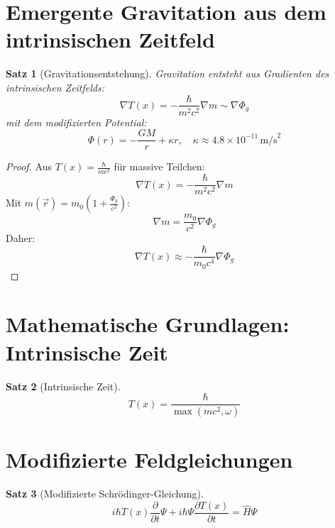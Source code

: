 \documentclass{article}
\newcommand{\Tfield}{T(x)}
\newtheorem{theorem}{Satz}[section]
\begin{document}
	\section{Emergente Gravitation aus dem intrinsischen Zeitfeld}
	\begin{theorem}[Gravitationsentstehung]
		Gravitation entsteht aus Gradienten des intrinsischen Zeitfelds:
		\begin{equation}
			\nabla \Tfield = -\frac{\hbar}{m^2 c^2} \nabla m \sim \nabla \Phi_g
		\end{equation}
		mit dem modifizierten Potential:
		\begin{equation}
			\Phi(r) = -\frac{GM}{r} + \kappa r, \quad \kappa \approx 4.8 \times 10^{-11} \, \text{m/s}^2
		\end{equation}
	\end{theorem}
	
	\begin{proof}
		Aus \( \Tfield = \frac{\hbar}{m c^2} \) für massive Teilchen:
		\begin{equation}
			\nabla \Tfield = -\frac{\hbar}{m^2 c^2} \nabla m
		\end{equation}
		Mit \( m(\vec{r}) = m_0 (1 + \frac{\Phi_g}{c^2}) \):
		\begin{equation}
			\nabla m = \frac{m_0}{c^2} \nabla \Phi_g
		\end{equation}
		Daher:
		\begin{equation}
			\nabla \Tfield \approx -\frac{\hbar}{m_0 c^4} \nabla \Phi_g
		\end{equation}
	\end{proof}
	
	\section{Mathematische Grundlagen: Intrinsische Zeit}
	\begin{theorem}[Intrinsische Zeit]
		\begin{equation}
			\Tfield = \frac{\hbar}{\max(m c^2, \omega)}
		\end{equation}
	\end{theorem}
	
	\section{Modifizierte Feldgleichungen}
	\begin{theorem}[Modifizierte Schrödinger-Gleichung]
		\begin{equation}
			i\hbar \Tfield \frac{\partial}{\partial t} \Psi + i\hbar \Psi \frac{\partial \Tfield}{\partial t} = \hat{H} \Psi
		\end{equation}
	\end{theorem}
	
\end{document}
